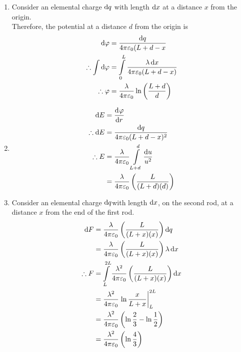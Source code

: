 \documentclass[fleqn, a4paper, 12pt, twoside]{article}
\theoremstyle{definition}
\theoremstyle{theorem}
\begin{document}
\begin{solution}
	\begin{enumerate}[leftmargin=*]
		\item 
			Consider an elemental charge $\dif q$ with length $\dif x$ at a distance $x$ from the origin.\\
			Therefore, the potential at a distance $d$ from the origin is
			\begin{align*}
				\dif \varphi &= \dfrac{\dif q}{4 \pi \varepsilon_0 (L + d - x}\\
				\therefore \int \dif \varphi &= \int\limits_{0}^{L} \dfrac{\lambda \dif x}{4 \pi \varepsilon_0 (L + d - x)}\\
				\therefore \varphi &= \dfrac{\lambda}{4 \pi \varepsilon_0} \ln \left( \dfrac{L + d}{d} \right)
			\end{align*}
		\item
			\begin{align*}
				\dif E &= \dod{\varphi}{r}\\
				\therefore \dif E &= \dfrac{\dif q}{4 \pi \varepsilon_0 (L + d - x)^2}\\
				\therefore E &= \dfrac{\lambda}{4 \pi \varepsilon_0} \int\limits_{L + d}^{d} \dfrac{\dif u}{u^2}\\
				&= \dfrac{\lambda}{4 \pi \varepsilon_0} \left( \dfrac{L}{(L + d) (d)} \right)
			\end{align*}
		\item
			Consider an elemental charge $\dif q$with length $\dif x$, on the second rod, at a distance $x$ from the end of the first rod.\\
			\begin{align*}
				\dif F &= \dfrac{\lambda}{4 \pi \varepsilon_0} \left( \dfrac{L}{(L + x) (x)} \right) \dif q\\
				&= \dfrac{\lambda}{4 \pi \varepsilon_0} \left( \dfrac{L}{(L + x) (x)} \right) \lambda \dif x\\
				\therefore F &= \int\limits_{L}^{2 L} \dfrac{\lambda^2}{4 \pi \varepsilon_0} \left( \dfrac{L}{(L + x) (x)} \right) \dif x\\
				&= \dfrac{\lambda^2}{4 \pi \varepsilon_0} \left. \ln \dfrac{x}{L + x} \right|_{L}^{2 L}\\
				&= \dfrac{\lambda^2}{4 \pi \varepsilon_0} \left( \ln \dfrac{2}{3} - \ln \dfrac{1}{2} \right)\\
				&= \dfrac{\lambda^2}{4 \pi \varepsilon_0} \left( \ln \dfrac{4}{3} \right)
			\end{align*}
	\end{enumerate}
\end{solution}
\end{document}
